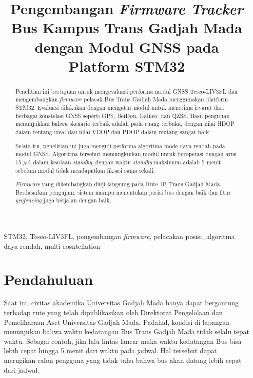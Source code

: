 \documentclass[conference]{IEEEtran}
\begin{document}
\title{Pengembangan \textit{Firmware Tracker} Bus Kampus Trans Gadjah Mada dengan Modul GNSS pada Platform STM32}

\author{
}

\maketitle

\begin{abstract}
	Penelitian ini bertujuan untuk mengevaluasi performa modul GNSS Teseo-LIV3FL dan mengembangkan \textit{firmware} pelacak Bus Trans Gadjah Mada menggunakan platform STM32. Evaluasi dilakukan dengan mengatur modul untuk menerima isyarat dari berbagai konstelasi GNSS seperti GPS, BeiDou, Galileo, dan QZSS. Hasil pengujian menunjukkan bahwa skenario terbaik adalah pada ruang terbuka, dengan nilai HDOP dalam rentang ideal dan nilai VDOP dan PDOP dalam rentang sangat baik.

	Selain itu, penelitian ini juga menguji performa algoritma mode daya rendah pada modul GNSS. Algoritma tersebut memungkinkan modul untuk beroperasi dengan arus 15 $\mu A$ dalam keadaan \textit{standby}, dengan waktu \textit{standby} maksimum adalah 5 menit sebelum modul tidak mendapatkan fiksasi sama sekali.
	
	\textit{Firmware} yang dikembangkan diuji langsung pada Rute 1B Trans Gadjah Mada. Berdasarkan pengujian, sistem mampu menentukan posisi bus dengan baik dan fitur \textit{geofencing} juga berjalan dengan baik.
\end{abstract}

\begin{IEEEkeywords}
STM32, Teseo-LIV3FL, pengembangan \textit{firmware}, pelacakan posisi, algoritma daya rendah, multi-cosntellation
\end{IEEEkeywords}

\section{Pendahuluan}
Saat ini, civitas akademika Universitas Gadjah Mada hanya dapat bergantung terhadap rute yang telah dipublikasikan oleh Direktorat Pengelolaan dan Pemeliharaan Aset Universitas Gadjah Mada. Padahal, kondisi di lapangan menunjukan bahwa waktu kedatangan Bus Trans Gadjah Mada tidak selalu tepat waktu. Sebagai contoh, jika lalu lintas lancar maka waktu kedatangan Bus bisa lebih cepat hingga 5 menit dari waktu pada jadwal. Hal tersebut dapat merugikan calon pengguna yang tidak tahu bahwa bus akan datang lebih cepat dari jadwal.
\end{document}
